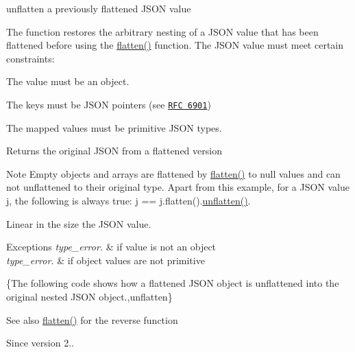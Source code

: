 unflatten a previously flattened J\+S\+ON value 

The function restores the arbitrary nesting of a J\+S\+ON value that has been flattened before using the \mbox{\hyperlink{classnlohmann_1_1basic__json_ab838f000d76662917ffd6ec529569e03}{flatten()}} function. The J\+S\+ON value must meet certain constraints\+:
\begin{DoxyEnumerate}
\item The value must be an object.
\item The keys must be J\+S\+ON pointers (see \href{https://tools.ietf.org/html/rfc6901}{\tt R\+FC 6901})
\item The mapped values must be primitive J\+S\+ON types.
\end{DoxyEnumerate}

\begin{DoxyReturn}{Returns}
the original J\+S\+ON from a flattened version
\end{DoxyReturn}
\begin{DoxyNote}{Note}
Empty objects and arrays are flattened by \mbox{\hyperlink{classnlohmann_1_1basic__json_ab838f000d76662917ffd6ec529569e03}{flatten()}} to {\ttfamily null} values and can not unflattened to their original type. Apart from this example, for a J\+S\+ON value {\ttfamily j}, the following is always true\+: {\ttfamily j == j.\+flatten().\mbox{\hyperlink{classnlohmann_1_1basic__json_a74fa3ab2003f2f6f2b69deaafed9126d}{unflatten()}}}.
\end{DoxyNote}
Linear in the size the J\+S\+ON value.


\begin{DoxyExceptions}{Exceptions}
{\em type\+\_\+error.} & if value is not an object \\
\hline
{\em type\+\_\+error.} & if object values are not primitive\\
\hline
\end{DoxyExceptions}
\{The following code shows how a flattened J\+S\+ON object is unflattened into the original nested J\+S\+ON object.,unflatten\}

\begin{DoxySeeAlso}{See also}
\mbox{\hyperlink{classnlohmann_1_1basic__json_ab838f000d76662917ffd6ec529569e03}{flatten()}} for the reverse function
\end{DoxySeeAlso}
\begin{DoxySince}{Since}
version 2.. 
\end{DoxySince}
\mbox{\label{classnlohmann_1_1basic__json_a1cfa9ae5e7c2434cab4cfe69bffffe11}} 
